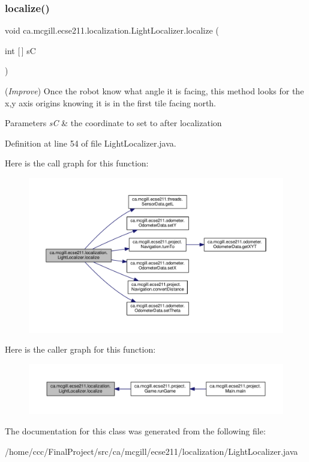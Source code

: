 \subsubsection{\texorpdfstring{localize()}{localize()}}
{\footnotesize\ttfamily void ca.\+mcgill.\+ecse211.\+localization.\+Light\+Localizer.\+localize (\begin{DoxyParamCaption}\item[{int \mbox{[}$\,$\mbox{]}}]{sC }\end{DoxyParamCaption})}

({\itshape Improve}) Once the robot know what angle it is facing, this method looks for the x,y axis origins knowing it is in the first tile facing north. 
\begin{DoxyParams}{Parameters}
{\em sC} & the coordinate to set to after localization \\
\hline
\end{DoxyParams}


Definition at line 54 of file Light\+Localizer.\+java.

Here is the call graph for this function\+:
\nopagebreak
\begin{figure}[H]
\begin{center}
\leavevmode
\includegraphics[width=350pt]{classca_1_1mcgill_1_1ecse211_1_1localization_1_1_light_localizer_a9fc3d6cdd897e9db86fc9d71dc914863_cgraph}
\end{center}
\end{figure}
Here is the caller graph for this function\+:
\nopagebreak
\begin{figure}[H]
\begin{center}
\leavevmode
\includegraphics[width=350pt]{classca_1_1mcgill_1_1ecse211_1_1localization_1_1_light_localizer_a9fc3d6cdd897e9db86fc9d71dc914863_icgraph}
\end{center}
\end{figure}


The documentation for this class was generated from the following file\+:\begin{DoxyCompactItemize}
\item 
/home/ccc/\+Final\+Project/src/ca/mcgill/ecse211/localization/Light\+Localizer.\+java\end{DoxyCompactItemize}
